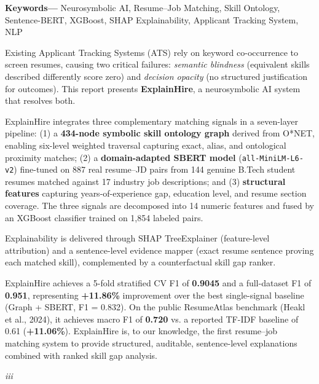 \documentclass[12pt,a4paper]{report}
\begin{document}
\vspace{10pt}

\noindent\textbf{Keywords---} Neurosymbolic AI, Resume--Job Matching, Skill Ontology, Sentence-BERT, XGBoost, SHAP Explainability, Applicant Tracking System, NLP

\vspace{12pt}

Existing Applicant Tracking Systems (ATS) rely on keyword co-occurrence to screen resumes, causing two critical failures: \textit{semantic blindness} (equivalent skills described differently score zero) and \textit{decision opacity} (no structured justification for outcomes). This report presents \textbf{ExplainHire}, a neurosymbolic AI system that resolves both.

ExplainHire integrates three complementary matching signals in a seven-layer pipeline: (1) a \textbf{434-node symbolic skill ontology graph} derived from O*NET, enabling six-level weighted traversal capturing exact, alias, and ontological proximity matches; (2) a \textbf{domain-adapted SBERT model} (\texttt{all-MiniLM-L6-v2}) fine-tuned on 887 real resume--JD pairs from 144 genuine B.Tech student resumes matched against 17 industry job descriptions; and (3) \textbf{structural features} capturing years-of-experience gap, education level, and resume section coverage. The three signals are decomposed into 14 numeric features and fused by an XGBoost classifier trained on 1,854 labeled pairs.

Explainability is delivered through SHAP TreeExplainer (feature-level attribution) and a sentence-level evidence mapper (exact resume sentence proving each matched skill), complemented by a counterfactual skill gap ranker.

ExplainHire achieves a 5-fold stratified CV F1 of \textbf{0.9045} and a full-dataset F1 of \textbf{0.951}, representing \textbf{+11.86\%} improvement over the best single-signal baseline (Graph + SBERT, F1 = 0.832). On the public ResumeAtlas benchmark (Heakl et al., 2024), it achieves macro F1 of \textbf{0.720} vs. a reported TF-IDF baseline of 0.61 (\textbf{+11.06\%}). ExplainHire is, to our knowledge, the first resume--job matching system to provide structured, auditable, sentence-level explanations combined with ranked skill gap analysis.

\vspace*{\fill}
\begin{center}{\small \textit{iii}}\end{center}
\end{document}
